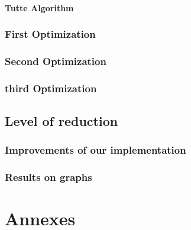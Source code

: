 \documentclass[12pt]{report}
\begin{document}
\subsection{Tutte Algorithm}
\section{First Optimization}
\section{Second Optimization}
\section{third Optimization}



\chapter{Level of reduction}

\section{Improvements of our implementation}
\section{Results on graphs}





\part{Annexes}
\appendix

\end{document}
